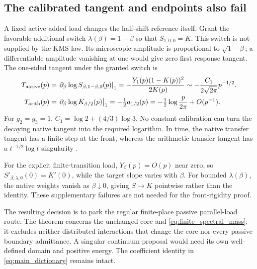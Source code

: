 \subsection{The calibrated tangent and endpoints also fail}

A fixed active added load changes the half-shift reference itself.
Grant the favorable additional switch $\lambda(\beta)=1-\beta$ so
that $S_{1,0,0}=K$. This switch is not supplied by the KMS law.
Its microscopic amplitude is proportional to $\sqrt{1-\beta}$;
a differentiable amplitude vanishing at one would give zero first
response tangent. The one-sided tangent under the granted switch is
\begin{align}
 T_{\rm native}(p)
 &=\left.\partial_\beta\log S_{\beta,1-\beta,0}(p)\right|_1
 =-\frac{Y_1(p)(1-K(p))^2}{2K(p)}
 \sim-\frac{C_1}{2\sqrt{2\pi}}p^{-1/2},\\
 T_{\rm arith}(p)
 &=\left.\partial_\beta\log K_{\beta/2}(p)\right|_1
 =-\tfrac12 a_{1/2}(p)
 =-\tfrac12\log\frac{p}{2\pi}+O(p^{-1}).
 \label{eq:boundary_tangent_failure}
\end{align}
For $g_2=g_3=1$, $C_1=\log2+(4/3)\log3$. No constant calibration
can turn the decaying native tangent into the required logarithm.
In time, the native transfer tangent has a finite step at the front,
whereas the arithmetic transfer tangent has a
$t^{-1/2}\log t$ singularity \cite[Section~7]{BoundaryNote}.

For the explicit finite-transition load, $Y_\beta(p)=O(p)$ near zero,
so $S'_{\beta,\lambda,0}(0)=K'(0)$, while the target slope varies
with $\beta$. For bounded $\lambda(\beta)$, the native weights vanish
as $\beta\downarrow0$, giving $S\to K$ pointwise rather than the
identity. These supplementary failures are not needed for the
front-rigidity proof.

The resulting decision is to park the regular finite-place passive
parallel-load route. The theorem concerns the unchanged core and
\eqref{eq:finite_spectral_mass}; it excludes neither distributed
interactions that change the core nor every passive boundary admittance.
A singular continuum proposal would need its own well-defined domain
and positive energy. The coefficient identity in
\eqref{eq:main_dictionary} remains intact.

